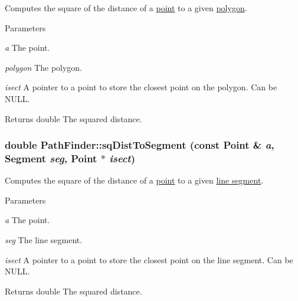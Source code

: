 Computes the square of the distance of a \hyperlink{structPathFinder_1_1Point}{point} to a given \hyperlink{structPathFinder_1_1ConvexPolygon}{polygon}. 


\begin{DoxyParams}{Parameters}
\item[{\em a}]The point. \item[{\em polygon}]The polygon. \item[{\em isect}]A pointer to a point to store the closest point on the polygon. Can be NULL. \end{DoxyParams}
\begin{DoxyReturn}{Returns}
double The squared distance. 
\end{DoxyReturn}
\hypertarget{classPathFinder_acd6d78c6d37c94e7ba8da35b02ed9a09}{
\subsubsection[{sqDistToSegment}]{\setlength{\rightskip}{0pt plus 5cm}double PathFinder::sqDistToSegment (const {\bf Point} \& {\em a}, \/  {\bf Segment} {\em seg}, \/  {\bf Point} $\ast$ {\em isect})}}
\label{classPathFinder_acd6d78c6d37c94e7ba8da35b02ed9a09}


Computes the square of the distance of a \hyperlink{structPathFinder_1_1Point}{point} to a given \hyperlink{structPathFinder_1_1Segment}{line segment}. 


\begin{DoxyParams}{Parameters}
\item[{\em a}]The point. \item[{\em seg}]The line segment. \item[{\em isect}]A pointer to a point to store the closest point on the line segment. Can be NULL. \end{DoxyParams}
\begin{DoxyReturn}{Returns}
double The squared distance. 
\end{DoxyReturn}


